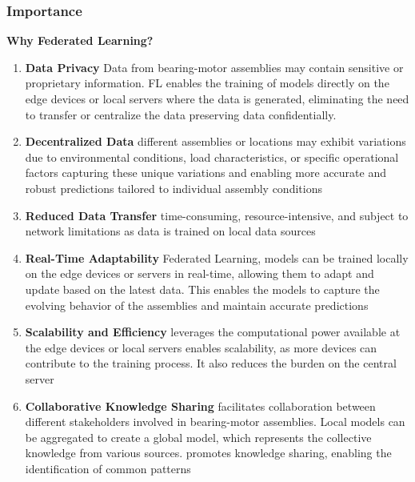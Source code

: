 \documentclass[9pt]{beamer}
\begin{document}
\begin{frame}
\frametitle{Importance}

\textbf{Why Federated Learning?}


\begin{enumerate}

    \item \textbf{Data Privacy} Data from bearing-motor assemblies may contain sensitive or proprietary information. FL enables the training of models directly on the edge devices or local servers where the data is generated, eliminating the need to transfer or centralize the data preserving data confidentially.
    
    \item \textbf{Decentralized Data} different assemblies or locations may exhibit variations due to environmental conditions, load characteristics, or specific operational factors capturing these unique variations and enabling more accurate and robust predictions tailored to individual assembly conditions

    
    \item \textbf{Reduced Data Transfer} time-consuming, resource-intensive, and subject to network limitations as data is trained on local data sources

    
    \item \textbf{Real-Time Adaptability} Federated Learning, models can be trained locally on the edge devices or servers in real-time, allowing them to adapt and update based on the latest data. This enables the models to capture the evolving behavior of the assemblies and maintain accurate predictions

    
    \item \textbf{Scalability and Efficiency} leverages the computational power available at the edge devices or local servers  enables scalability, as more devices can contribute to the training process. It also reduces the burden on the central server
    
    
    \item \textbf{Collaborative Knowledge Sharing} facilitates collaboration between different stakeholders involved in bearing-motor assemblies. Local models can be aggregated to create a global model, which represents the collective knowledge from various sources. promotes knowledge sharing, enabling the identification of common patterns

\end{enumerate}

\end{frame}
\end{document}
